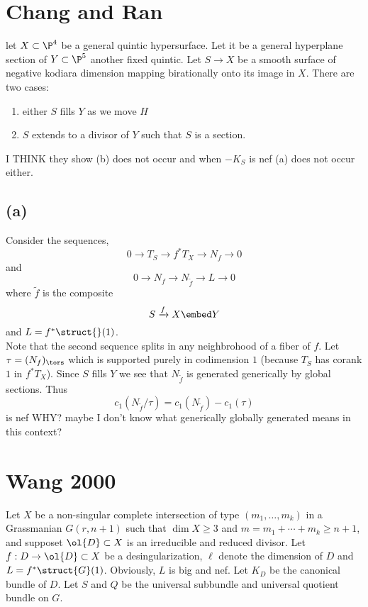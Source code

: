 \documentclass[12pt]{article}
\theoremstyle{plain}
\begin{document}
\section{Chang and Ran}

let $X \subset \P^4$ be a general quintic hypersurface. Let it be a general hyperplane section of $Y \subset \P^5$ another fixed quintic. Let $S \to X$ be a smooth surface of negative kodiara dimension mapping birationally onto its image in $X$. There are two cases:
\begin{enumerate}
\item either $S$ fills $Y$ as we move $H$
\item $S$ extends to a divisor of $Y$ such that $S$ is a section.
\end{enumerate}

I THINK they show (b) does not occur and when $-K_S$ is nef (a) does not occur either.

\subsection{(a)}

Consider the sequences,
\[ 0 \to T_S \to f^* T_{X} \to N_f \to 0 \]
and 
\[ 0 \to N_f \to N_{\tilde{f}} \to L \to 0 \]
where $\tilde{f}$ is the composite 
\[ S \xrightarrow{f} X \embed Y \]
and $L = f^* \struct{}(1)$. 
\bigskip\\
Note that the second sequence splits in any neighbrohood of a fiber of $f$. Let $\tau = (N_f)_{\tors}$ which is supported purely in codimension $1$ (because $T_S$ has corank $1$ in $f^* T_X$). Since $S$ fills $Y$ we see that $N_{\tilde{f}}$ is generated generically by global sections. Thus 
\[ c_1(N_{\tilde{f}} / \tau) = c_1(N_{\tilde{f}}) - c_1(\tau) \]
is nef {\color{red} WHY? maybe I don't know what generically globally generated means in this context?}

\section{Wang 2000}

Let $X$ be a non-singular complete intersection of type $(m_1, \dots, m_k)$ in a Grassmanian $G(r, n+1)$ such that $\dim{X} \ge 3$ and $m = m_1 + \cdots + m_k \ge n + 1$, and supposet $\ol{D} \subset X$ is an irreducible and reduced divisor. Let $f : D \to \ol{D} \subset X$ be a desingularization, $\ell$ denote the dimension of $D$ and $L = f^* \struct{G}(1)$. Obviously, $L$ is big and nef. Let $K_D$ be the canonical bundle of $D$. Let $S$ and $Q$ be the universal subbundle and universal quotient bundle on $G$. 
\end{document}
